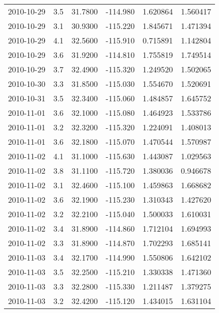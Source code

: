 \begin{tabular}{lrrrrr}
2010-10-29 &       3.5 &  31.7800 &  -114.980 &         1.620864 &         1.560417 \\
2010-10-29 &       3.1 &  30.9300 &  -115.220 &         1.845671 &         1.471394 \\
2010-10-29 &       4.1 &  32.5600 &  -115.910 &         0.715891 &         1.142804 \\
2010-10-29 &       3.6 &  31.9200 &  -114.810 &         1.755819 &         1.749514 \\
2010-10-29 &       3.7 &  32.4900 &  -115.320 &         1.249520 &         1.502065 \\
2010-10-30 &       3.3 &  31.8500 &  -115.030 &         1.554670 &         1.520691 \\
2010-10-31 &       3.5 &  32.3400 &  -115.060 &         1.484857 &         1.645752 \\
2010-11-01 &       3.6 &  32.1000 &  -115.080 &         1.464923 &         1.533786 \\
2010-11-01 &       3.2 &  32.3200 &  -115.320 &         1.224091 &         1.408013 \\
2010-11-01 &       3.6 &  32.1800 &  -115.070 &         1.470544 &         1.570987 \\
2010-11-02 &       4.1 &  31.1000 &  -115.630 &         1.443087 &         1.029563 \\
2010-11-02 &       3.8 &  31.1100 &  -115.720 &         1.380036 &         0.946678 \\
2010-11-02 &       3.1 &  32.4600 &  -115.100 &         1.459863 &         1.668682 \\
2010-11-02 &       3.6 &  32.1900 &  -115.230 &         1.310343 &         1.427620 \\
2010-11-02 &       3.2 &  32.2100 &  -115.040 &         1.500033 &         1.610031 \\
2010-11-02 &       3.4 &  31.8900 &  -114.860 &         1.712104 &         1.694993 \\
2010-11-02 &       3.3 &  31.8900 &  -114.870 &         1.702293 &         1.685141 \\
2010-11-03 &       3.4 &  32.1700 &  -114.990 &         1.550806 &         1.642102 \\
2010-11-03 &       3.5 &  32.2500 &  -115.210 &         1.330338 &         1.471360 \\
2010-11-03 &       3.3 &  32.2800 &  -115.330 &         1.211487 &         1.379275 \\
2010-11-03 &       3.2 &  32.4200 &  -115.120 &         1.434015 &         1.631104 \\

\end{tabular}
